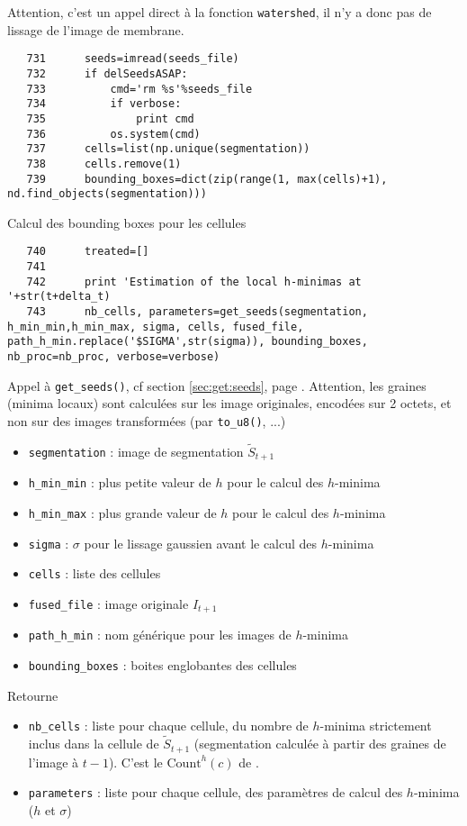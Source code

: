 \documentclass{article}
\def \mycolor {red}
\begin{document}
Attention, c'est un appel direct \`a la fonction \texttt{watershed}, il n'y a donc pas de lissage de l'image de membrane.
\color{black}
\begin{verbatim}  
   731	    seeds=imread(seeds_file)
   732	    if delSeedsASAP:
   733	        cmd='rm %s'%seeds_file
   734	        if verbose:
   735	            print cmd
   736	        os.system(cmd)
   737	    cells=list(np.unique(segmentation))
   738	    cells.remove(1)
   739	    bounding_boxes=dict(zip(range(1, max(cells)+1), nd.find_objects(segmentation)))
\end{verbatim} 
\color{\mycolor}
Calcul des bounding boxes pour les cellules 
\color{black}
\begin{verbatim}  
   740	    treated=[]
   741	
   742	    print 'Estimation of the local h-minimas at '+str(t+delta_t)
   743	    nb_cells, parameters=get_seeds(segmentation, h_min_min,h_min_max, sigma, cells, fused_file, path_h_min.replace('$SIGMA',str(sigma)), bounding_boxes, nb_proc=nb_proc, verbose=verbose)
\end{verbatim} 
\color{\mycolor}
Appel \`a \texttt{get\_seeds()}, cf section \ref{sec:get:seeds}, page \pageref{sec:get:seeds}. Attention, les graines (minima locaux) sont calcul\'ees sur les image originales, encod\'ees sur 2 octets, et non sur des images transform\'ees (par \verb|to_u8()|, ...)
\begin{itemize}
\itemsep -0.5ex
\item \verb|segmentation| : image de segmentation $\tilde{S}_{t+1}$ 
\item \verb|h_min_min| : plus petite valeur de $h$ pour le calcul des $h$-minima
\item \verb|h_min_max| : plus grande valeur de $h$ pour le calcul des $h$-minima
\item \verb|sigma| : $\sigma$ pour le lissage gaussien avant le calcul des $h$-minima
\item \verb|cells| : liste des cellules
\item \verb|fused_file| : image originale $I_{t+1}$
\item \verb|path_h_min| : nom g\'en\'erique pour les images de $h$-minima
\item \verb|bounding_boxes| : boites englobantes des cellules
\end{itemize}
Retourne
\begin{itemize}
\itemsep -0.5ex
\item \verb|nb_cells| : liste pour chaque cellule, du nombre de $h$-minima strictement inclus dans la cellule de  $\tilde{S}_{t+1}$ (segmentation calcul\'ee \`a partir des graines de l'image \`a $t-1$). C'est le $\mathrm{Count}^{h}(c)$ de \cite[section 2.3.3.5, page 71]{guignard:tel-01278725}.
\item \verb|parameters| : liste pour chaque cellule,  des param\`etres de calcul des $h$-minima ($h$ et $\sigma$)
\end{itemize}
\end{document}
